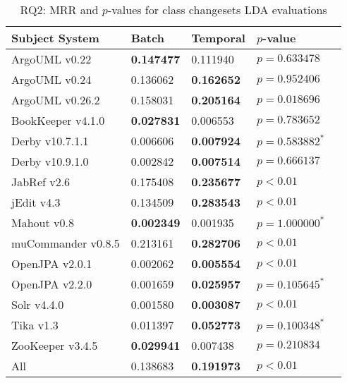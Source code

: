 
\begin{table}[t]
\renewcommand{\arraystretch}{1.3}
\footnotesize
\centering
\caption{RQ2: MRR and $p$-values for class changesets LDA evaluations}
\begin{tabular}{l|ll|ll}
   \toprule
    Subject System & Batch           & Temporal        & $p$-value          \\
    \midrule

ArgoUML v0.22      & {\bf 0.147477 } & 0.111940        & $p = 0.633478$     \\
ArgoUML v0.24      & 0.136062        & {\bf 0.162652 } & $p = 0.952406$     \\
ArgoUML v0.26.2    & 0.158031        & {\bf 0.205164 } & $p = 0.018696$     \\
BookKeeper v4.1.0  & {\bf 0.027831 } & 0.006553        & $p = 0.783652$     \\
Derby v10.7.1.1    & 0.006606        & {\bf 0.007924 } & $p = 0.583882^{*}$ \\
Derby v10.9.1.0    & 0.002842        & {\bf 0.007514 } & $p = 0.666137$     \\
JabRef v2.6        & 0.175408        & {\bf 0.235677 } & $p < 0.01$         \\
jEdit v4.3         & 0.134509        & {\bf 0.283543 } & $p < 0.01$         \\
Mahout v0.8        & {\bf 0.002349 } & 0.001935        & $p = 1.000000^{*}$ \\
muCommander v0.8.5 & 0.213161        & {\bf 0.282706 } & $p < 0.01$         \\
OpenJPA v2.0.1     & 0.002062        & {\bf 0.005554 } & $p < 0.01$         \\
OpenJPA v2.2.0     & 0.001659        & {\bf 0.025957 } & $p = 0.105645^{*}$ \\
Solr v4.4.0        & 0.001580        & {\bf 0.003087 } & $p < 0.01$         \\
Tika v1.3          & 0.011397        & {\bf 0.052773 } & $p = 0.100348^{*}$ \\
ZooKeeper v3.4.5   & {\bf 0.029941 } & 0.007438        & $p = 0.210834$     \\
\midrule
All                & 0.138683        & {\bf 0.191973 } & $p < 0.01$         \\

    \bottomrule
\end{tabular}
\label{table:rq2:class:lda}
\end{table}

